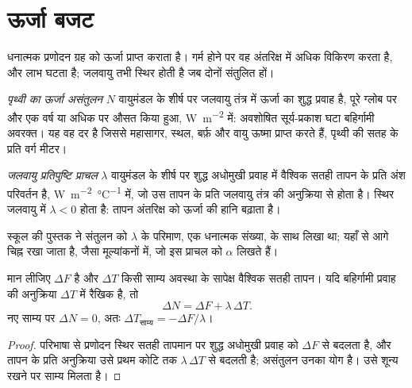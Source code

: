 \section{ऊर्जा बजट}\label{sec:b2:anthropogenic-climate-change:energy}

धनात्मक प्रणोदन ग्रह को ऊर्जा प्राप्त कराता है। गर्म होने पर वह अंतरिक्ष में अधिक विकिरण करता है, और
लाभ घटता है; जलवायु तभी स्थिर होती है जब दोनों संतुलित हों।

\begin{definition}[पृथ्वी का ऊर्जा असंतुलन; जलवायु प्रतिपुष्टि प्राचल]\label{def:b2:anthropogenic-climate-change:eei}
\emph{पृथ्वी का ऊर्जा असंतुलन} $N$ वायुमंडल के शीर्ष पर जलवायु तंत्र में
ऊर्जा का शुद्ध प्रवाह है, पूरे ग्लोब पर और एक वर्ष या अधिक पर औसत किया हुआ,
\unit{W.m^{-2}} में: अवशोषित सूर्य-प्रकाश घटा बहिर्गामी अवरक्त। यह वह दर है जिससे महासागर,
स्थल, बर्फ़ और वायु ऊष्मा प्राप्त करते हैं, पृथ्वी की सतह के प्रति वर्ग मीटर।
\end{definition}

\begin{definition}[जलवायु प्रतिपुष्टि प्राचल]\label{def:b2:anthropogenic-climate-change:lambda}
\emph{जलवायु प्रतिपुष्टि प्राचल} $\lambda$ वायुमंडल के शीर्ष पर शुद्ध
अधोमुखी प्रवाह में वैश्विक सतही तापन के प्रति अंश परिवर्तन है,
\unit{W.m^{-2}.\celsius^{-1}} में, जो उस तापन के प्रति जलवायु तंत्र की अनुक्रिया से होता है।
स्थिर जलवायु में $\lambda < 0$ होता है: तापन अंतरिक्ष को ऊर्जा की हानि बढ़ाता है।
\end{definition}

स्कूल की पुस्तक ने संतुलन को $\lambda$ के परिमाण, एक धनात्मक संख्या, के साथ लिखा था; यहाँ से आगे
चिह्न रखा जाता है, जैसा मूल्यांकनों में, जो इस प्राचल को $\alpha$ लिखते हैं।

\begin{proposition}[वैश्विक ऊर्जा संतुलन]\label{prop:b2:anthropogenic-climate-change:balance}
मान लीजिए $\Delta F$  है और $\Delta T$ किसी साम्य अवस्था के सापेक्ष वैश्विक सतही
तापन। यदि बहिर्गामी प्रवाह की अनुक्रिया $\Delta T$ में रैखिक है, तो
\[
  \Delta N = \Delta F + \lambda\,\Delta T .
\]
नए साम्य पर $\Delta N = 0$, अतः $\Delta T_{\text{साम्य}} = -\Delta F/\lambda$।
\end{proposition}
\begin{proof}
परिभाषा से प्रणोदन स्थिर सतही तापमान पर शुद्ध अधोमुखी प्रवाह को $\Delta F$ से बदलता है, और तापन
के प्रति अनुक्रिया उसे प्रथम कोटि तक $\lambda\,\Delta T$ से बदलती है;
असंतुलन उनका योग है। उसे शून्य रखने पर साम्य मिलता है।
\end{proof}

